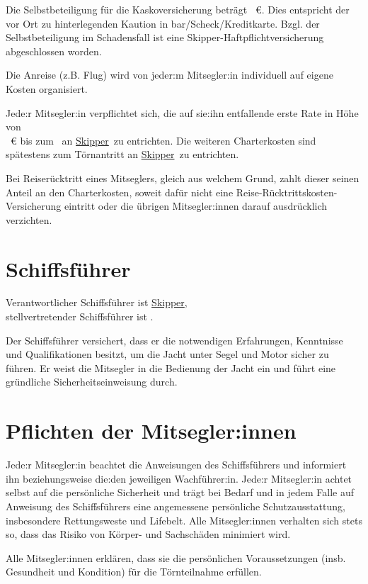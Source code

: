 \documentclass[a4paper,12pt]{article}
\newcommand{\openlength}[1]{\hspace{0.25cm} \makebox[#1]{\hrulefill}\hspace{0.25cm}}
\newcommand{\open}{\openlength{4cm}}
\newcommand{\skipper}{\underline{Skipper}} %
\begin{document}
Die Selbstbeteiligung für die Kaskoversicherung beträgt \mbox{\openlength{1cm}\euro}.
Dies entspricht der vor Ort zu hinterlegenden Kaution in bar/Scheck/Kreditkarte.
Bzgl. der Selbstbeteiligung im Schadensfall ist eine Skipper-Haftpflichtversicherung abgeschlossen worden.

Die Anreise (z.B. Flug) wird von jeder:m Mitsegler:in individuell auf eigene Kosten organisiert.

Jede:r Mitsegler:in verpflichtet sich, die auf sie:ihn entfallende erste Rate in Höhe von\\
\mbox{\openlength{1cm}\euro} bis zum \open\ an \skipper\ zu entrichten.
Die weiteren Charterkosten sind spätestens zum Törnantritt an \skipper\ zu entrichten.

Bei Reiserücktritt eines Mitseglers, gleich aus welchem Grund, zahlt dieser seinen Anteil an den Charterkosten, soweit dafür nicht eine Reise-Rücktrittskosten-Versicherung eintritt oder die übrigen Mitsegler:innen darauf ausdrücklich verzichten.


\section{Schiffsführer}
\label{sec:Skipper}

Verantwortlicher Schiffsführer ist \skipper,\\
stellvertretender Schiffsführer ist \open.

Der Schiffsführer versichert, dass er die notwendigen Erfahrungen, Kenntnisse und Qualifikationen besitzt, um die Jacht unter Segel und Motor sicher zu führen.
Er weist die Mitsegler in die Bedienung der Jacht ein und führt eine gründliche Sicherheitseinweisung durch.


\section{Pflichten der Mitsegler:innen}
\label{sec:Pflichten}

Jede:r Mitsegler:in beachtet die Anweisungen des Schiffsführers und informiert ihn beziehungsweise die:den jeweiligen Wachführer:in.
Jede:r Mitsegler:in achtet selbst auf die persönliche Sicherheit und trägt bei Bedarf und in jedem Falle auf Anweisung des Schiffsführers eine angemessene persönliche Schutzausstattung, insbesondere Rettungsweste und Lifebelt.
Alle Mitsegler:innen verhalten sich stets so, dass das Risiko von Körper- und Sachschäden minimiert wird.

Alle Mitsegler:innen erklären, dass sie die persönlichen Voraussetzungen (insb. Gesundheit und Kondition) für die Törnteilnahme erfüllen.
\end{document}
